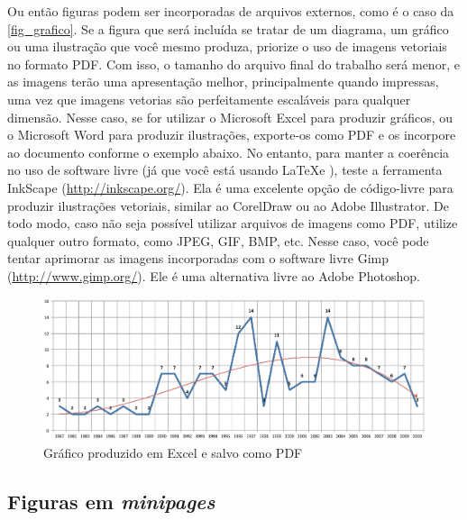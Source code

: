 \documentclass[12pt,oneside,a4paper,chapter=TITLE,english,brazil]{abntex2}
\begin{document}
\begin{anexosenv}
Ou então figuras podem ser incorporadas de arquivos externos, como é o caso da \autoref{fig_grafico}. Se a figura que será incluída se tratar de um diagrama, um gráfico ou uma ilustração que você mesmo produza, priorize o uso de imagens vetoriais no formato PDF. Com isso, o tamanho do arquivo final do trabalho será menor, e as imagens terão uma apresentação melhor, principalmente quando impressas, uma vez que imagens vetorias são perfeitamente escaláveis para qualquer dimensão. Nesse caso, se for utilizar o Microsoft Excel para produzir gráficos, ou o Microsoft Word para produzir ilustrações, exporte-os como PDF e os incorpore ao documento conforme o exemplo abaixo. No entanto, para manter a coerência no uso de software livre (já que você está usando \LaTeX e \abnTeX), teste a ferramenta \textsf{InkScape} (\url{http://inkscape.org/}). Ela é uma excelente opção de código-livre para produzir ilustrações vetoriais, similar ao CorelDraw ou ao Adobe Illustrator. De todo modo, caso não seja possível utilizar arquivos de imagens como PDF, utilize qualquer outro formato, como JPEG, GIF, BMP, etc. Nesse caso, você pode tentar aprimorar as imagens incorporadas com o software livre \textsf{Gimp} (\url{http://www.gimp.org/}). Ele é uma alternativa livre ao Adobe Photoshop.
\begin{figure}[htb]
	\caption{\label{fig_grafico}Gráfico produzido em Excel e salvo como PDF}
	\begin{center}
	    \includegraphics[scale=0.5]{figuras/abntex2-modelo-img-grafico.pdf}
	\end{center}
\end{figure}

\subsection{Figuras em \emph{minipages}}


\end{anexosenv}
\end{document}
